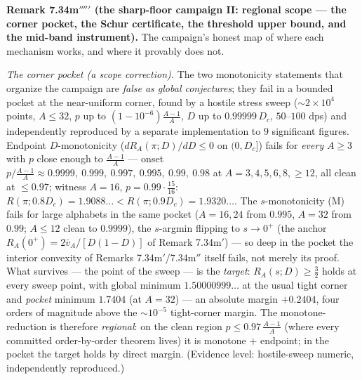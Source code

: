 \documentclass[
]{article}
\begin{document}
\textbf{Remark 7.34m$'''''$ (the sharp-floor campaign II: regional scope ---
the corner pocket, the Schur certificate, the threshold upper bound, and the
mid-band instrument).} The campaign's honest map of where each mechanism
works, and where it provably does not.

\emph{The corner pocket (a scope correction).} The two monotonicity statements
that organize the campaign are \emph{false as global conjectures}; they fail
in a bounded pocket at the near-uniform corner, found by a hostile stress
sweep ($\sim2\times10^4$ points, $A\le32$, $p$ up to
$(1-10^{-6})\tfrac{A-1}A$, $D$ up to $0.99999\,D_c$, $50$--$100$ dps) and
independently reproduced by a separate implementation to $9$ significant
figures. Endpoint $D$-monotonicity ($dR_A(\pi;D)/dD\le0$ on $(0,D_c]$) fails
for \emph{every} $A\ge3$ with $p$ close enough to $\tfrac{A-1}A$ --- onset
$p\big/\tfrac{A-1}A\approx0.9999,\ 0.999,\ 0.997,\ 0.995,\ 0.99,\ 0.98$ at
$A=3,4,5,6,8,{\ge}12$, all clean at $\le0.97$; witness $A=16$,
$p=0.99\cdot\tfrac{15}{16}$: $R(\pi;0.8D_c)=1.9088\ldots<R(\pi;0.9D_c)
=1.9320\ldots$. The $s$-monotonicity (M) fails for large alphabets in the same
pocket ($A=16,24$ from $0.995$, $A=32$ from $0.99$; $A\le12$ clean to
$0.9999$), the $s$-argmin flipping to $s\to0^+$ (the anchor
$R_A(0^+)=2\bar v_A/[D(1-D)]$ of Remark 7.34m$'$) --- so deep in the pocket
the interior convexity of Remarks 7.34m$'$/7.34m$''$ itself fails, not merely
its proof. What survives --- the point of the sweep --- is the \emph{target}:
$R_A(s;D)\ge\tfrac32$ holds at every sweep point, with global minimum
$1.50000999\ldots$ at the usual tight corner and \emph{pocket} minimum
$1.7404$ (at $A=32$) --- an absolute margin $+0.2404$, four orders of
magnitude above the $\sim10^{-5}$ tight-corner margin. The
monotone-reduction is therefore \emph{regional}: on the clean region
$p\le0.97\,\tfrac{A-1}A$ (where every committed order-by-order theorem lives)
it is monotone $+$ endpoint; in the pocket the target holds by direct margin.
(Evidence level: hostile-sweep numeric, independently reproduced.)
\end{document}
